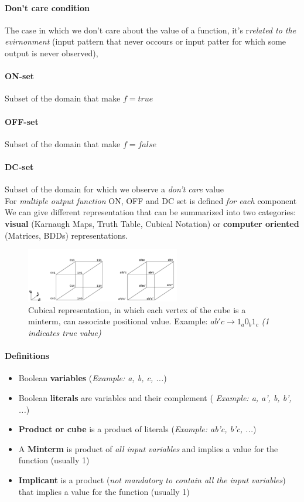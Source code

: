 \paragraph{Don't care condition}
The case in which we don't care about the value of a function, it's r\textit{related to the evirnonment} (input pattern that never occours or input patter for which some output is never observed),
\paragraph{ON-set}
Subset of the domain that make $ f = true $
\paragraph{OFF-set}
Subset of the domain that make $ f = false $
\paragraph{DC-set}
Subset of the domain for which we observe a \textit{don't care} value
\bigskip\\
For \textit{multiple output function}  ON, OFF and DC set is defined \textit{for each} component
\bigskip\\
We can give different representation that can be summarized into two categories: \textbf{visual} (Karnaugh Maps, Truth Table, Cubical Notation) or \textbf{computer oriented} (Matrices, BDDs) representations.
\begin{figure}[H]
	\centering
	\includegraphics[width=0.6\textwidth]{./Cap6/Images/Image3.png}
	\caption{Cubical representation, in which each vertex of the cube is a minterm, can associate positional value. Example: $ ab'c \rightarrow 1_{a}0_{b}1_{c} $ \textit{(1 indicates true value)}}
	\label{fig:cubicalnotation}
\end{figure}
\paragraph{Definitions}
\begin{itemize}
	\item Boolean \textbf{variables} (\textit{Example: a, b, c, ...}) 
	\item Boolean \textbf{literals} are variables and their complement ( \textit{Example: a, a', b, b', ...})
	\item \textbf{Product or cube} is a product of literals (\textit{Example: ab'c, b'c, ...})
	\item A \textbf{Minterm} is product of \textit{all input variables} and implies a value for the function (usually 1)
	\item \textbf{Implicant} is a product (\textit{not mandatory to contain all the input variables}) that implies a value for the function (usually 1)
\end{itemize}
